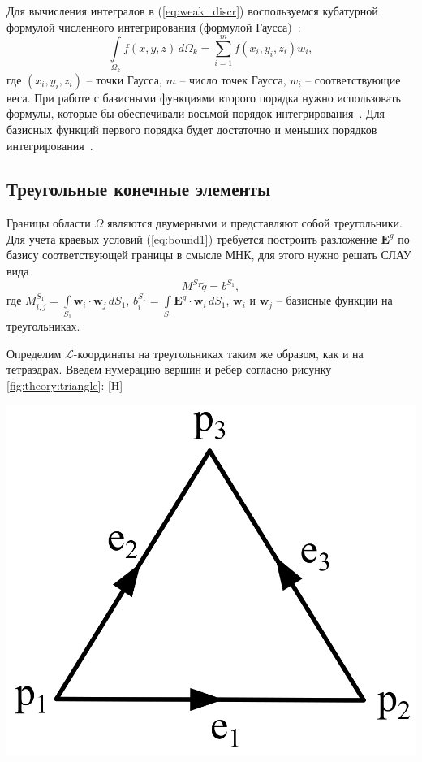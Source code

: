 \documentclass[a4paper,14pt]{article}
\makeatletter
\renewenvironment{figure}[1][\fps@figure]{
  \edef\@tempa{\noexpand\@float{figure}[#1]}
  \@tempa
  \addtocounter{foofigure}{1}
}{
  \end@float
}
\makeatother
\begin{document}
Для вычисления интегралов в (\ref{eq:weak_discr}) воспользуемся кубатурной формулой численного интегрирования (формулой Гаусса)~\citep{misovskih}:
\begin{equation*}
	\int\limits_{\Omega_k} f(x, y, z) \,d\Omega_k = \sum\limits_{i = 1}^m f( x_i , y_i , z_i ) w_i ,
\end{equation*}
где $(x_i , y_i , z_i )$ -- точки Гаусса, $m$ -- число точек Гаусса, $w_i$ -- соответствующие веса. При работе с базисными функциями второго порядка нужно использовать формулы, которые бы обеспечивали восьмой порядок интегрирования~\citep{zhang_integration}. Для базисных функций первого порядка будет достаточно и меньших порядков интегрирования~\citep{tet_integration, misovskih}.


\subsection{Треугольные конечные элементы}

Границы области $\Omega$ являются двумерными и представляют собой треугольники. Для учета краевых условий (\ref{eq:bound1}) требуется построить разложение $\mathbf{E}^g$ по базису соответствующей границы в смысле МНК, для этого нужно решать СЛАУ вида
\begin{equation}
	M^{S_1} \tilde{q} = b^{S_1} ,
	\label{eq:bound_mnk}
\end{equation}
где $\displaystyle M^{S_1}_{i,j} = \int\limits_{S_1} \mathbf{w}_i \cdot \mathbf{w}_j \,d S_1$, $\displaystyle b^{S_1}_{i} = \int\limits_{S_1} \mathbf{E}^g \cdot \mathbf{w}_i \,d S_1$, $\mathbf{w}_i$ и $\mathbf{w}_j$ -- базисные функции на треугольниках.

Определим $\mathcal{L}$-координаты на треугольниках таким же образом, как и на тетраэдрах. Введем нумерацию вершин и ребер согласно рисунку \ref{fig:theory:triangle}:
\begin{figure}[H]
	\centering
	\includegraphics[scale=0.25]{theory/triangle.png}
	\caption{треугольный конечный элемент}
	\label{fig:theory:triangle}
\end{figure}
\end{document}
